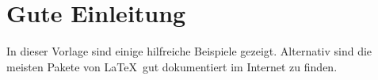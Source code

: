 
\chapter{Gute Einleitung}

In dieser Vorlage sind einige hilfreiche Beispiele gezeigt. Alternativ sind die meisten Pakete von \LaTeX~gut dokumentiert im Internet zu finden.